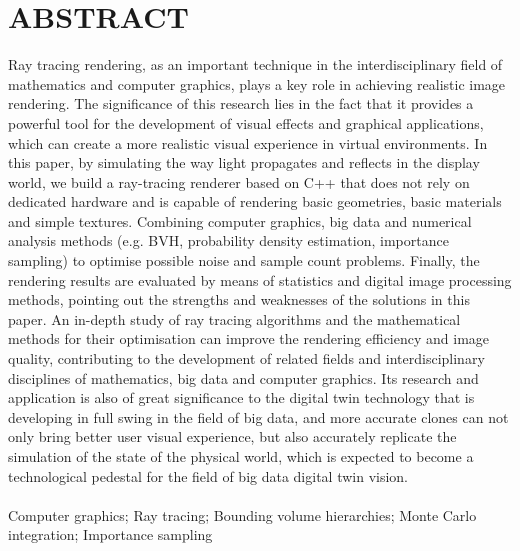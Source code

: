 \section*{\bfseries ABSTRACT}
Ray tracing rendering, as an important technique in the interdisciplinary field of mathematics and computer graphics, plays a key role in achieving realistic image rendering. The significance of this research lies in the fact that it provides a powerful tool for the development of visual effects and graphical applications, which can create a more realistic visual experience in virtual environments. In this paper, by simulating the way light propagates and reflects in the display world, we build a ray-tracing renderer based on C++ that does not rely on dedicated hardware and is capable of rendering basic geometries, basic materials and simple textures. Combining computer graphics, big data and numerical analysis methods (e.g. BVH, probability density estimation, importance sampling) to optimise possible noise and sample count problems. Finally, the rendering results are evaluated by means of statistics and digital image processing methods, pointing out the strengths and weaknesses of the solutions in this paper. An in-depth study of ray tracing algorithms and the mathematical methods for their optimisation can improve the rendering efficiency and image quality, contributing to the development of related fields and interdisciplinary disciplines of mathematics, big data and computer graphics. Its research and application is also of great significance to the digital twin technology that is developing in full swing in the field of big data, and more accurate clones can not only bring better user visual experience, but also accurately replicate the simulation of the state of the physical world, which is expected to become a technological pedestal for the field of big data digital twin vision.
\\
\\
Computer graphics; Ray tracing; Bounding volume hierarchies; Monte Carlo integration; Importance sampling

\clearpage




